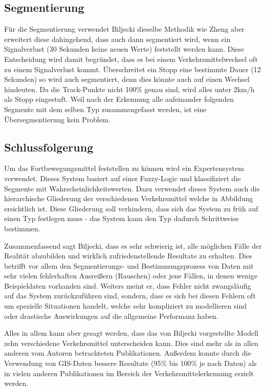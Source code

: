 \subsection{Segmentierung}
Für die Segmentierung verwendet Biljecki dieselbe Methodik wie Zheng aber erweitert diese dahingehend, dass auch dann segmentiert wird, wenn ein Signalverlust (30 Sekunden keine neuen Werte) feststellt werden kann. Diese Entscheidung wird damit begründet, dass es bei einem Verkehrsmittelwechsel oft zu einem Signalverlust kommt. 
Überschreitet ein Stopp eine bestimmte Dauer (12 Sekunden) so wird auch segmentiert, denn dies könnte auch auf einen Wechsel hindeuten. Da die Track-Punkte nicht 100\% genau sind, wird alles unter 2km/h als Stopp eingestuft. Weil nach der Erkennung alle aufeinander folgenden Segmente mit dem selben Typ zusammengefasst werden, ist eine Übersegmentierung kein Problem.

\subsection{Schlussfolgerung}
Um das Fortbewegungsmittel feststellen zu können wird ein Expertensystem verwendet. Dieses System basiert auf einer Fuzzy-Logic und klassifiziert die Segmente mit Wahrscheinlichkeitswerten. Dazu verwendet dieses System auch die hierarchische Gliederung der verschiedenen Verkehrsmittel welche in Abbildung  ersichtlich ist. Diese Gliederung soll verhindern, dass sich das System zu früh auf einen Typ festlegen muss - das System kann den Typ dadurch Schrittweise bestimmen.


Zusammenfassend sagt Biljecki, dass es sehr schwierig ist, alle möglichen Fälle der Realität abzubilden und wirklich zufriedenstellende Resultate zu erhalten. Dies betrifft vor allem den Segmentierungs- und Bestimmungsprozess von Daten mit sehr vielen fehlerhaften Ausreißern (Rauschen) oder jene Fällen, in denen wenige Beispieldaten vorhanden sind. Weiters meint er, dass Fehler nicht zwangsläufig auf das System zurückzuführen sind, sondern, dass es sich bei diesen Fehlern oft um spezielle Situationen handelt, welche sehr kompliziert zu modellieren sind oder drastische Auswirkungen auf die allgemeine Performanz haben.

Alles in allem kann aber gesagt werden, dass das von Biljecki vorgestellte Modell zehn verschiedene Verkehrsmittel unterscheiden kann. Dies sind mehr als in allen anderen vom Autoren betrachteten Publikationen. Außerdem konnte durch die Verwendung von GIS-Daten bessere Resultate (95\% bis 100\% je nach Daten) als in vielen anderen Publikationen im Bereich der Verkehrsmittelerkennung erzielt werden. 

